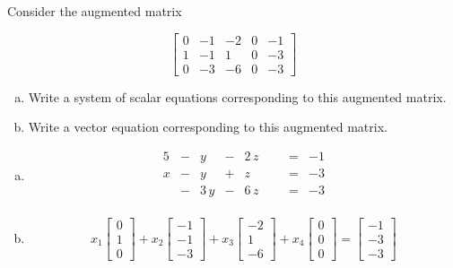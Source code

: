 
\begin{exerciseStatement}


 Consider the augmented matrix 

\[ \left[\begin{array}{cccc|c}
0 & -1 & -2 & 0 & -1 \\
1 & -1 & 1 & 0 & -3 \\
0 & -3 & -6 & 0 & -3
\end{array}\right] \]
\begin{enumerate}[(a)]
\item  Write a system of scalar equations corresponding to this augmented matrix. 
\item  Write a vector equation corresponding to this augmented matrix. 
\end{enumerate}
    
\end{exerciseStatement}
    
\begin{exerciseAnswer} 

\begin{enumerate}[(a)]
\item 
\begin{alignat*}{5}  &-& y &-& 2 \, z & &  &=& -1 \\x &-& y &+& z & &  &=& -3 \\ &-& 3 \, y &-& 6 \, z & &  &=& -3 \\ \end{alignat*}
            
\item \[ x_{1} \left[\begin{array}{c}
0 \\
1 \\
0
\end{array}\right] + x_{2} \left[\begin{array}{c}
-1 \\
-1 \\
-3
\end{array}\right] + x_{3} \left[\begin{array}{c}
-2 \\
1 \\
-6
\end{array}\right] + x_{4} \left[\begin{array}{c}
0 \\
0 \\
0
\end{array}\right] = \left[\begin{array}{c}
-1 \\
-3 \\
-3
\end{array}\right] \]
\end{enumerate}
    
\end{exerciseAnswer}
    
